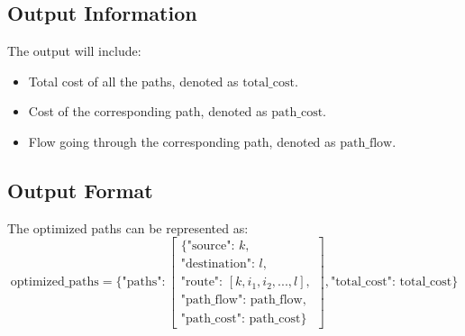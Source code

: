\documentclass{article}
\begin{document}
\subsection*{Output Information}
The output will include:
\begin{itemize}
    \item Total cost of all the paths, denoted as \( \text{total\_cost} \).
    \item Cost of the corresponding path, denoted as \( \text{path\_cost} \).
    \item Flow going through the corresponding path, denoted as \( \text{path\_flow} \).
\end{itemize}

\subsection*{Output Format}
The optimized paths can be represented as:
\[
\text{optimized\_paths} = \{ 
\text{"paths"}: 
    \begin{bmatrix}
        \{ \text{"source": } k, \\
          \text{"destination": } l, \\
          \text{"route": } [k, i_1, i_2, ..., l], \\
          \text{"path\_flow": } \text{path\_flow}, \\
          \text{"path\_cost": } \text{path\_cost} \} 
    \end{bmatrix}, 
\text{"total\_cost": } \text{total\_cost} 
\}
\]
\end{document}
